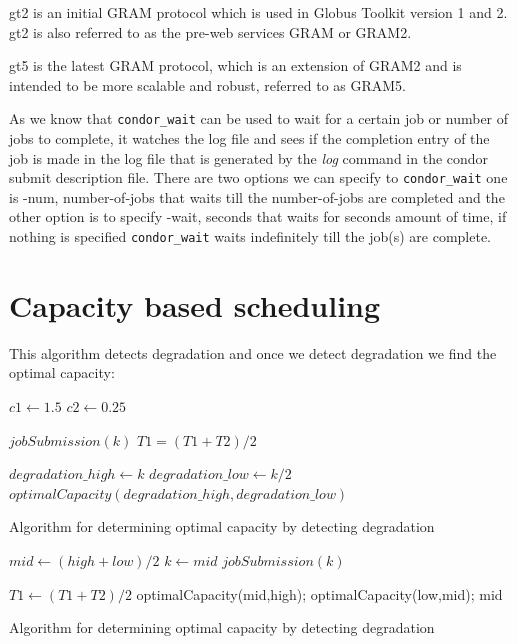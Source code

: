 \documentclass[ms,electronic,double]{nuthesis}
\begin{document}
gt2 is an initial GRAM protocol which is used in Globus Toolkit version 1 and 
2. gt2 is also referred to as the pre-web services GRAM or GRAM2.

gt5 is the latest GRAM protocol, which is an extension of GRAM2 and is intended 
to be more scalable and robust, referred to as GRAM5.

As we know that \texttt{condor\_wait} can be used to wait for a certain job or 
number of jobs to complete, it watches the log file and sees if the completion 
entry of the job is made in the log file that is generated by the \emph{log} 
command in the condor submit description file. There are two options we can 
specify to \texttt{condor\_wait} one is -num, number-of-jobs that waits
till the number-of-jobs are completed and the other option is to specify -wait, seconds that 
waits for seconds amount of time, if nothing is specified \texttt{condor\_wait} waits indefinitely till
the job(s) are complete.

\section{Capacity based scheduling}

This algorithm detects degradation and once we detect degradation we find the 
optimal capacity:

\begin{algorithm}
\begin{algorithmic}
\STATE $c1 \gets 1.5$ 
\STATE $c2 \gets 0.25$ 

  \STATE $jobSubmission(k)$ 
  \STATE $T1=(T1+T2)/2$
\ENDIF

  \STATE $degradation\_high \gets k$
  \STATE $degradation\_low \gets k/2$
  \STATE $optimalCapacity(degradation\_high,degradation\_low)$
\ENDIF

\ENDWHILE

\end{algorithmic}
\caption{Algorithm for determining optimal capacity by detecting degradation}
\label{alg:Degradation Detection}
\end{algorithm}


\begin{algorithm}
\begin{algorithmic}

\STATE $mid \gets (high+low)/2$ 
\STATE $k \gets mid$
\STATE $jobSubmission(k)$ 

\STATE $T1 \gets (T1+T2)/2$
\STATE optimalCapacity(mid,high);
\ENDIF  
{}
\STATE optimalCapacity(low,mid);
\ENDIF
\RETURN mid
\end{algorithmic}
\caption{Algorithm for determining optimal capacity by detecting degradation}
\label{alg:optimalCapacity(high,low)}
\end{algorithm}
\end{document}
